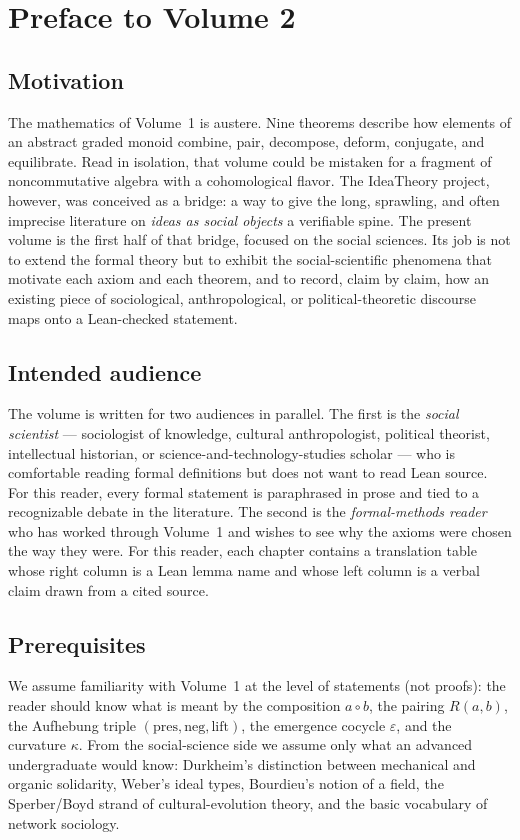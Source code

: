 \documentclass[11pt,oneside]{book}
\begin{document}
\tableofcontents

\chapter*{Preface to Volume 2}

\section*{Motivation}
The mathematics of Volume~1 is austere. Nine theorems describe how
elements of an abstract graded monoid combine, pair, decompose,
deform, conjugate, and equilibrate. Read in isolation, that volume
could be mistaken for a fragment of noncommutative algebra with a
cohomological flavor. The IdeaTheory project, however, was conceived
as a bridge: a way to give the long, sprawling, and often imprecise
literature on \emph{ideas as social objects} a verifiable spine. The
present volume is the first half of that bridge, focused on the
social sciences. Its job is not to extend the formal theory but to
exhibit the social-scientific phenomena that motivate each axiom and
each theorem, and to record, claim by claim, how an existing piece of
sociological, anthropological, or political-theoretic discourse maps
onto a Lean-checked statement.

\section*{Intended audience}
The volume is written for two audiences in parallel. The first is the
\emph{social scientist} — sociologist of knowledge, cultural
anthropologist, political theorist, intellectual historian, or
science-and-technology-studies scholar — who is comfortable reading
formal definitions but does not want to read Lean source. For this
reader, every formal statement is paraphrased in prose and tied to a
recognizable debate in the literature. The second is the
\emph{formal-methods reader} who has worked through Volume~1 and
wishes to see why the axioms were chosen the way they were. For this
reader, each chapter contains a translation table whose right column
is a Lean lemma name and whose left column is a verbal claim drawn
from a cited source.

\section*{Prerequisites}
We assume familiarity with Volume~1 at the level of statements (not
proofs): the reader should know what is meant by the composition
$a\circ b$, the pairing $R(a,b)$, the Aufhebung triple
$(\mathrm{pres},\mathrm{neg},\mathrm{lift})$, the emergence cocycle
$\varepsilon$, and the curvature $\kappa$. From the social-science
side we assume only what an advanced undergraduate would know:
Durkheim's distinction between mechanical and organic solidarity,
Weber's ideal types, Bourdieu's notion of a field, the Sperber/Boyd
strand of cultural-evolution theory, and the basic vocabulary of
network sociology.
\end{document}
